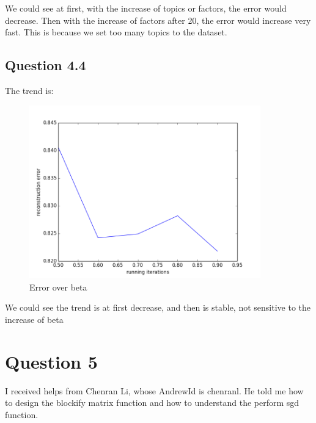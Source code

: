 \documentclass{article} %
\begin{document}
We could see at first, with the increase of topics or factors, the error would
decrease. Then with the increase of factors after 20, the error would increase
very fast. This is because we set too many topics to the dataset.

\subsection{Question 4.4}
The trend is:
\begin{figure}[h]
\begin{center}
\includegraphics[width=10cm]{pic/q44.png}
\end{center}
\caption{Error over beta}
\end{figure}

We could see the trend is at first decrease, and then is stable, not sensitive
to the increase of beta



\section{Question 5}

I received helps from Chenran Li, whose AndrewId is chenranl. He told me how to
design the blockify matrix function and how to understand the perform sgd
function.
\end{document}
